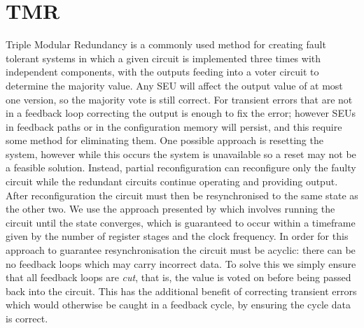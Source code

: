 \documentclass[12pt,final,oneside]{memoir} %
\begin{document}
\section{\acl{TMR}}
Triple Modular Redundancy is a commonly used method for creating fault tolerant systems in which a given circuit is implemented three times with independent components, with the outputs feeding into a voter circuit to determine the majority value. Any \ac{SEU} will affect the output value of at most one version, so the majority vote is still correct. For transient errors that are not in a feedback loop correcting the output is enough to fix the error; however \acp{SEU} in feedback paths or in the configuration memory will persist, and this require some method for eliminating them. One possible approach is resetting the system, however while this occurs the system is unavailable so a reset may not be a feasible solution. Instead, partial reconfiguration can reconfigure only the faulty circuit while the redundant circuits continue operating and providing output. After reconfiguration the circuit must then be resynchronised to the same state as the other two. We use the approach presented by \cite{DiesselChange} which involves running the circuit until the state converges, which is guaranteed to occur within a timeframe given by the number of register stages and the clock frequency. In order for this approach to guarantee resynchronisation the circuit must be acyclic: there can be no feedback loops which may carry incorrect data. To solve this we simply ensure that all feedback loops are \emph{cut}, that is, the value is voted on before being passed back into the circuit. This has the additional benefit of correcting transient errors which would otherwise be caught in a feedback cycle, by ensuring the cycle data is correct.
 
 
 
 
 
\end{document}
